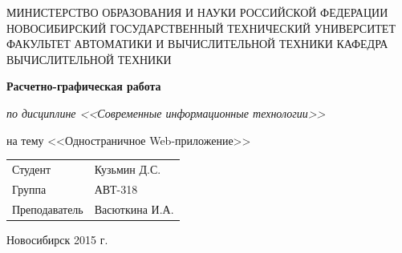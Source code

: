 \documentclass{article}
\begin{document}
\begin{center}

МИНИСТЕРСТВО ОБРАЗОВАНИЯ И НАУКИ РОССИЙСКОЙ ФЕДЕРАЦИИ
НОВОСИБИРСКИЙ ГОСУДАРСТВЕННЫЙ ТЕХНИЧЕСКИЙ УНИВЕРСИТЕТ
ФАКУЛЬТЕТ АВТОМАТИКИ И ВЫЧИСЛИТЕЛЬНОЙ ТЕХНИКИ
КАФЕДРА ВЫЧИСЛИТЕЛЬНОЙ ТЕХНИКИ

\vspace{\fill}
{\bfseries \Large Расчетно-графическая работа}

{\itshape по дисциплине <<Современные информационные технологии>>}

на тему <<Одностраничное Web-приложение>>

\vspace{\fill}

\begin{flushleft}
\begin{tabular}{ l l }
Студент & Кузьмин Д.С. \\
Группа & АВТ-318 \\
Преподаватель & Васюткина И.А. \\
\end{tabular}
\end{flushleft}

\vspace{\fill}
Новосибирск 2015 г.
\end{center}
\pagebreak

\end{document}
